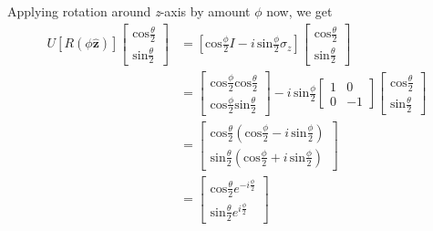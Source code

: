     Applying rotation around \textit{z}-axis by amount $\phi$ now, we get 
    \begin{equation*}
        \begin{split}
            U[R(\phi\hat{\mathbf{z}})]
            \begin{bmatrix}
                \textrm{cos}\frac{\theta}{2} \\
                \textrm{sin}\frac{\theta}{2}
            \end{bmatrix} & = \left[ \textrm{cos}\frac{\phi}{2}I - i \, \textrm{sin}\frac{\phi}{2}\sigma_{z} \right]
            \begin{bmatrix}
                \textrm{cos}\frac{\theta}{2} \\
                \textrm{sin}\frac{\theta}{2}
            \end{bmatrix} \\
            & = 
            \begin{bmatrix}
                \textrm{cos}\frac{\phi}{2}\textrm{cos}\frac{\theta}{2} \\
                \textrm{cos}\frac{\phi}{2}\textrm{sin}\frac{\theta}{2}
            \end{bmatrix} - i \, \textrm{sin}\frac{\phi}{2}
            \begin{bmatrix}
                1 & 0 \\
                0 & -1
            \end{bmatrix}
            \begin{bmatrix}
                \textrm{cos}\frac{\theta}{2} \\
                \textrm{sin}\frac{\theta}{2}
            \end{bmatrix} \\
            & = 
            \begin{bmatrix}
                \textrm{cos}\frac{\theta}{2} \left( \textrm{cos}\frac{\phi}{2} - i \, \textrm{sin}\frac{\phi}{2}\right) \\
                \textrm{sin}\frac{\theta}{2} \left( \textrm{cos}\frac{\phi}{2} + i \, \textrm{sin}\frac{\phi}{2} \right)
            \end{bmatrix} \\
            & = 
            \begin{bmatrix}
                \textrm{cos}\frac{\theta}{2}e^{-i\frac{\phi}{2}} \\
                \textrm{sin}\frac{\theta}{2}e^{i\frac{\phi}{2}}
            \end{bmatrix}
        \end{split}
    \end{equation*}

